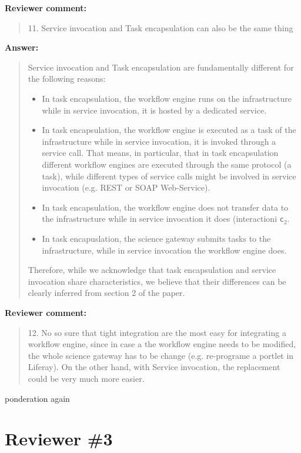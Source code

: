 \documentclass[a4]{article}
\newenvironment{review}%
{\textbf{Reviewer comment:}\begin{quote}}%
{\end{quote}}%
\newenvironment{answer}%
{\textbf{Answer:}\begin{small}\begin{quote}}%
{\end{quote}\end{small}}%
\newcommand{\todo}[1]{\color{red}#1\color{black}}
\begin{document}
\begin{review}
  11. Service invocation and Task encapsulation can also be the same
  thing
\end{review}

\begin{answer}
  Service invocation and Task encapsulation are fundamentally different for the following reasons:
  \begin{itemize}
  \item In task encapsulation, the workflow engine runs on the infrastructure while in service invocation, it is hosted by a dedicated service.
  \item In task encapsulation, the workflow engine is executed as a task of the infrastructure while in service invocation, it is invoked through a service call. That means, in particular, that in task encapsulation different workflow engines are executed through the same protocol (a task), while different types of service calls might be involved in service invocation (e.g. REST or SOAP Web-Service).
  \item In task encapsulation, the workflow engine does not transfer data to the infrastructure while in service invocation it does (interactioni \texttt{c$_2$}.
  \item In task encapuslation, the science gateway submits tasks to the infrastructure, while in service invocation the workflow engine does.
  \end{itemize}
  Therefore, while we acknowledge that task encapsulation and service
  invocation share characteristics, we believe that their differences
  can be clearly inferred from section 2 of the paper. 
\end{answer}

\begin{review}
12. No so sure that tight integration are the most easy for
integrating a workflow engine, since in case a the workflow engine
needs to be modified, the whole science gateway has to be change
(e.g. re-programe a portlet in Liferay). On the other hand, with
Service invocation, the replacement could be very much more easier.
\end{review}

\todo{ponderation again}

\section{Reviewer \#3}
\end{document}
